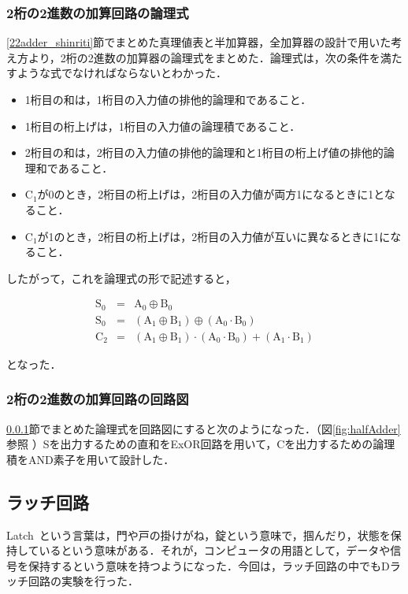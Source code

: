 %
%
\subsubsection{2桁の2進数の加算回路の論理式}
\label{22adder_ronrishiki}
\ref{22adder_shinriti}節でまとめた真理値表と半加算器，全加算器の設計で用いた考え方より，2桁の2進数の加算器の論理式をまとめた．論理式は，次の条件を満たすような式でなければならないとわかった．

\begin{itemize}
	\item 1桁目の和は，1桁目の入力値の排他的論理和であること．
	\item 1桁目の桁上げは，1桁目の入力値の論理積であること．
	\item 2桁目の和は，2桁目の入力値の排他的論理和と1桁目の桁上げ値の排他的論理和であること．
	\item $\mathrm{C_{1}}$が0のとき，2桁目の桁上げは，2桁目の入力値が両方1になるときに1となること．
	\item $\mathrm{C_{1}}$が1のとき，2桁目の桁上げは，2桁目の入力値が互いに異なるときに1になること．
\end{itemize}

したがって，これを論理式の形で記述すると，

\begin{eqnarray}
	\mathrm{S_0} &=&  \mathrm{A_0} \oplus \mathrm{B_0}  \nonumber \\
	\mathrm{S_0} &=& ( \mathrm{A_1} \oplus \mathrm{B_1} )\oplus ( \mathrm{A_0} \cdot \mathrm{B_0} )\nonumber \\
	\mathrm{C_2} &=& ( \mathrm{A_1} \oplus \mathrm{B_1} ) \cdot ( \mathrm{A_0} \cdot \mathrm{B_0} ) + ( \mathrm{A_1} \cdot \mathrm{B_1} )\nonumber
\end{eqnarray}

となった．

%
%
\subsubsection{2桁の2進数の加算回路の回路図}
\label{fulladder_kairozu}
\ref{22adder_ronrishiki}節でまとめた論理式を回路図にすると次のようになった．（図\ref{fig:halfAdder}参照 ）Sを出力するための直和をExOR回路を用いて，Cを出力するための論理積をAND素子を用いて設計した．

%
%
\subsection{ラッチ回路}
\label{experiment_latch}
Latch~という言葉は，門や戸の掛けがね，錠という意味で，掴んだり，状態を保持しているという意味がある．それが，コンピュータの用語として，データや信号を保持するという意味を持つようになった．今回は，ラッチ回路の中でもDラッチ回路の実験を行った．

